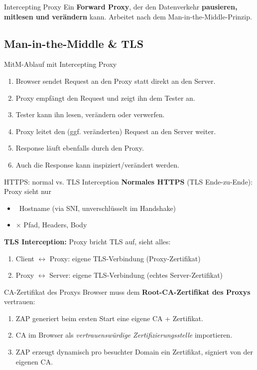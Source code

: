 \documentclass[a4paper, fontsize=7pt]{scrartcl}
\begin{document}
\begin{mainbox}{Intercepting Proxy}
Ein \textbf{Forward Proxy}, der den Datenverkehr \textbf{pausieren, mitlesen und
verändern} kann. Arbeitet nach dem Man-in-the-Middle-Prinzip.
\end{mainbox}

\subsection{Man-in-the-Middle \& TLS}

\begin{mainbox}{MitM-Ablauf mit Intercepting Proxy}
\begin{enumerate}
    \item Browser sendet Request an den Proxy statt direkt an den Server.
    \item Proxy empfängt den Request und zeigt ihn dem Tester an.
    \item Tester kann ihn lesen, verändern oder verwerfen.
    \item Proxy leitet den (ggf. veränderten) Request an den Server weiter.
    \item Response läuft ebenfalls durch den Proxy.
    \item Auch die Response kann inspiziert/verändert werden.
\end{enumerate}
\end{mainbox}

\begin{mainbox}{HTTPS: normal vs. TLS Interception}
\textbf{Normales HTTPS} (TLS Ende-zu-Ende): Proxy sieht nur
\begin{itemize}
    \item \checkmark\ Hostname (via SNI, unverschlüsselt im Handshake)
    \item $\times$ Pfad, Headers, Body
\end{itemize}
\textbf{TLS Interception:} Proxy bricht TLS auf, sieht alles:
\begin{enumerate}
    \item Client $\leftrightarrow$ Proxy: eigene TLS-Verbindung (Proxy-Zertifikat)
    \item Proxy $\leftrightarrow$ Server: eigene TLS-Verbindung (echtes
          Server-Zertifikat)
\end{enumerate}
\end{mainbox}

\begin{mainbox}{CA-Zertifikat des Proxys}
Browser muss dem \textbf{Root-CA-Zertifikat des Proxys} vertrauen:
\begin{enumerate}
    \item ZAP generiert beim ersten Start eine eigene CA + Zertifikat.
    \item CA im Browser als \emph{vertrauenswürdige Zertifizierungsstelle}
          importieren.
    \item ZAP erzeugt dynamisch pro besuchter Domain ein Zertifikat, signiert von
          der eigenen CA.
\end{enumerate}
\end{mainbox}
\end{document}
